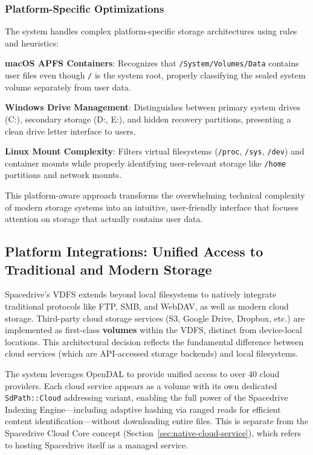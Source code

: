 \documentclass[sigconf]{acmart}
\begin{document}
\subsubsection{Platform-Specific Optimizations}
The system handles complex platform-specific storage architectures using rules and heuristics:

\textbf{macOS APFS Containers}: Recognizes that \texttt{/System/Volumes/Data} contains user files even though \texttt{/} is the system root, properly classifying the sealed system volume separately from user data.

\textbf{Windows Drive Management}: Distinguishes between primary system drives (C:), secondary storage (D:, E:), and hidden recovery partitions, presenting a clean drive letter interface to users.

\textbf{Linux Mount Complexity}: Filters virtual filesystems (\texttt{/proc}, \texttt{/sys}, \texttt{/dev}) and container mounts while properly identifying user-relevant storage like \texttt{/home} partitions and network mounts.

This platform-aware approach transforms the overwhelming technical complexity of modern storage systems into an intuitive, user-friendly interface that focuses attention on storage that actually contains user data.


\subsection{Platform Integrations: Unified Access to Traditional and Modern Storage}
\label{sec:platform-integrations}

Spacedrive's VDFS extends beyond local filesystems to natively integrate traditional protocols like FTP, SMB, and WebDAV, as well as modern cloud storage. Third-party cloud storage services (S3, Google Drive, Dropbox, etc.) are implemented as first-class \textbf{volumes} within the VDFS, distinct from device-local locations. This architectural decision reflects the fundamental difference between cloud services (which are API-accessed storage backends) and local filesystems.

The system leverages OpenDAL to provide unified access to over 40 cloud providers. Each cloud service appears as a volume with its own dedicated \texttt{SdPath::Cloud} addressing variant, enabling the full power of the Spacedrive Indexing Engine—including adaptive hashing via ranged reads for efficient content identification—without downloading entire files. This is separate from the Spacedrive Cloud Core concept (Section~\ref{sec:native-cloud-service}), which refers to hosting Spacedrive itself as a managed service.
\end{document}
